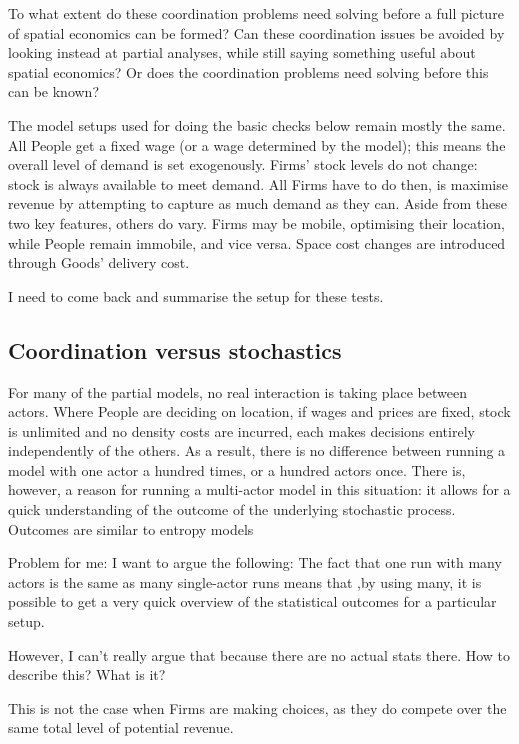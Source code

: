 To what extent do these coordination problems need solving before a full picture of spatial economics can be formed? Can these coordination issues be avoided by looking instead at partial analyses, while still saying something useful about spatial economics? Or does the coordination problems need solving before this can be known?

The model setups used for doing the basic checks below remain mostly the same. All People get a fixed wage (or a wage determined by the model); this means the overall level of demand is set exogenously. Firms' stock levels do not change: stock is always available to meet demand. All Firms have to do then, is maximise revenue by attempting to capture as much demand as they can. Aside from these two key features, others do vary. Firms may be mobile, optimising their location, while People remain immobile, and vice versa. Space cost changes are introduced through Goods' delivery cost.

I need to come back and summarise the setup for these tests.

\subsection{Coordination versus stochastics}

For many of the partial models, no real interaction is taking place between actors. Where People are deciding on location, if wages and prices are fixed, stock is unlimited and no density costs are incurred, each makes decisions entirely independently of the others. As a result, there is no difference between running a model with one actor a hundred times, or a hundred actors once. There is, however, a reason for running a multi-actor model in this situation: it allows for a quick understanding of the outcome of the underlying stochastic process. Outcomes are similar to entropy models 

Problem for me: I want to argue the following: The fact that one run with many actors is the same as many single-actor runs means that ,by using many, it is possible to get a very quick overview of the statistical outcomes for a particular setup.

However, I can't really argue that because there are no actual stats there. How to describe this? What is it?

This is not the case when Firms are making choices, as they do compete over the same total level of potential revenue.

